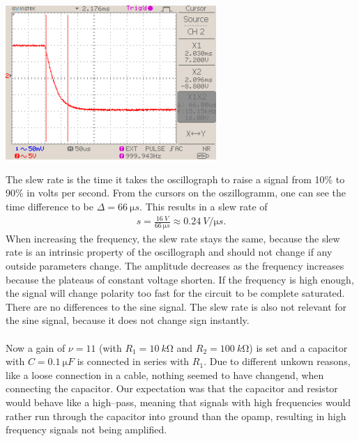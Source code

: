 \documentclass[a4paper,10pt]{article}
\newenvironment{Figure}
        {\par\medskip\noindent\minipage{\linewidth}}
        {\endminipage\par\medskip}
\numberwithin{equation}{section}
\begin{document}
\begin{multicols}{2}
\begin{Figure}
                \includegraphics[width=0.6\textwidth]{../data/DS0026_negate.png}
        \end{Figure}
        \noindent The slew rate is the time it takes the oscillograph to raise a signal from 10\% to 90\% in volts per second.
        From the cursors on the oszillogramm, one can see the time difference to be $\Delta =\SI{66}{\micro s}$.
        This results in a slew rate of 
        \begin{align}
                s=\tfrac{\SI{16}{V}}{\SI{66}{\micro s}}\approx \SI{0.24}{V\per\micro s}.
        \end{align}
        When increasing the frequency, the slew rate stays the same, because the slew rate is an intrinsic property of the oscillograph and should not change if any outside parameters change.
        The amplitude decreases as the frequency increases because the plateaus of constant voltage shorten.
        If the frequency is high enough, the signal will change polarity too fast for the circuit to be complete saturated.
        There are no differences to the sine signal.
        The slew rate is also not relevant for the sine signal, because it does not change sign instantly.
        \\\\ Now a gain of $\nu =11$ (with $R_1=\SI{10}{k\ohm}$ and $R_2=\SI{100}{k\ohm}$) is set and a capacitor with $C=\SI{0.1}{\micro F}$ is connected in series with $R_1$.
        Due to different unkown reasons, like a loose connection in a cable, nothing seemed to have changend, when connecting the capacitor.
        Our expectation was that the capacitor and resistor would behave like a high--pass, meaning that signals with high frequencies would rather run through the capacitor into ground than the opamp, resulting in high frequency signals not being amplified.


\end{multicols}
\end{document}
